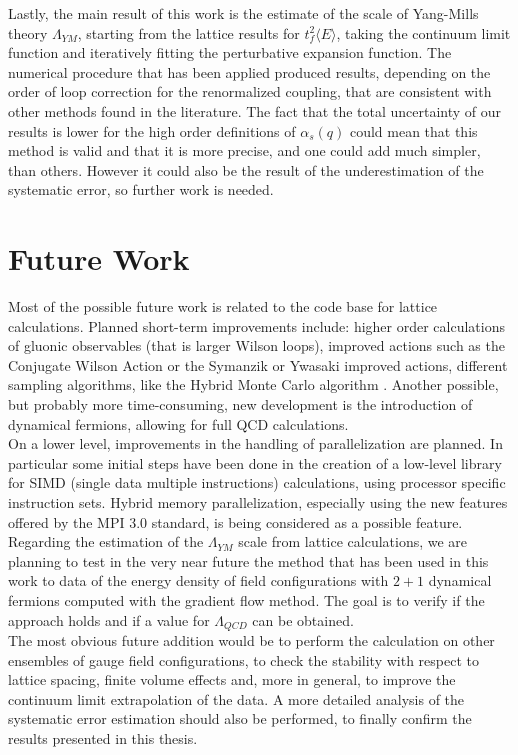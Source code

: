 Lastly, the main result of this work is the estimate of the scale of Yang-Mills theory $\Lambda_{YM}$, starting from the lattice results for $t_f^2\langle E\rangle$, taking the continuum limit function and iteratively fitting the perturbative expansion function. The numerical procedure that has been applied produced results, depending on the order of loop correction for the renormalized coupling, that are consistent with other methods found in the literature. The fact that the total uncertainty of our results is lower for the high order definitions of $\alpha_s(q)$ could mean that this method is valid and that it is more precise, and one could add much simpler, than others. However it could also be the result of the underestimation of the systematic error, so further work is needed. 

\section{Future Work}
Most of the possible future work is related to the code base for lattice calculations. Planned short-term improvements include: higher order calculations of gluonic observables (that is larger Wilson loops), improved actions such as the Conjugate Wilson Action or the Symanzik or Ywasaki \cite{alexandrou_topological_2015} improved actions, different sampling algorithms, like the Hybrid Monte Carlo algorithm \cite{alles_hybrid_1996}. Another possible, but probably more time-consuming, new development is the introduction of dynamical fermions, allowing for full QCD calculations.\\
On a lower level, improvements in the handling of parallelization are planned. In particular some initial steps have been done in the creation of a low-level library for SIMD (single data multiple instructions) calculations, using processor specific instruction sets. Hybrid memory parallelization, especially using the new features offered by the MPI 3.0 standard, is being considered as a possible feature.\\
    
Regarding the estimation of the $\Lambda_{YM}$ scale from lattice calculations, we are planning to test in the very near future the method that has been used in this work to data of the energy density of field configurations with $2+1$ dynamical fermions computed with the gradient flow method. The goal is to verify if the approach holds and if a value for $\Lambda_{QCD}$ can be obtained. \\
The most obvious future addition would be to perform the calculation on other ensembles of gauge field configurations, to check the stability with respect to lattice spacing, finite volume effects and, more in general, to improve the continuum limit extrapolation of the data. A more detailed analysis of the systematic error estimation should also be performed, to finally confirm the results presented in this thesis.
